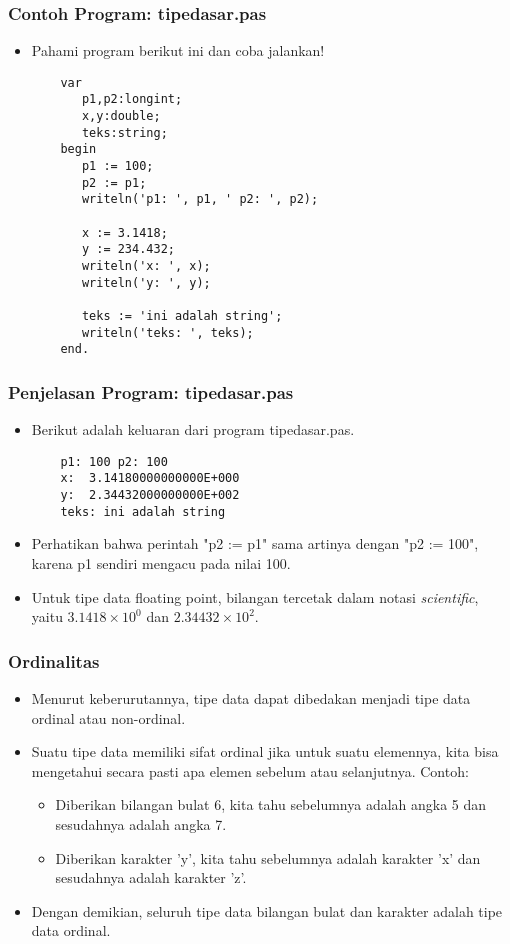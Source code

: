 \documentclass{beamer}
\begin{document}
\begin{frame}[fragile]
\frametitle{Contoh Program: tipedasar.pas}
\begin{itemize}
	\item Pahami program berikut ini dan coba jalankan!
	\begin{lstlisting}
	var
	   p1,p2:longint;
	   x,y:double;
	   teks:string;
	begin
	   p1 := 100;
	   p2 := p1;
	   writeln('p1: ', p1, ' p2: ', p2);
	   
	   x := 3.1418;
	   y := 234.432;
	   writeln('x: ', x);
	   writeln('y: ', y);
	   
	   teks := 'ini adalah string';
	   writeln('teks: ', teks);
	end.
	\end{lstlisting}
\end{itemize}
\end{frame}

\begin{frame}[fragile]
\frametitle{Penjelasan Program: tipedasar.pas}
\begin{itemize}
	\item Berikut adalah keluaran dari program tipedasar.pas.
	\begin{lstlisting}
	p1: 100 p2: 100
	x:  3.14180000000000E+000
	y:  2.34432000000000E+002
	teks: ini adalah string
	\end{lstlisting}
	\item Perhatikan bahwa perintah "p2 := p1" sama artinya dengan "p2 := 100", karena p1 sendiri mengacu pada nilai 100.
	\item Untuk tipe data floating point, bilangan tercetak dalam notasi \textit{scientific}, yaitu $3.1418 \times 10^{0}$ dan $2.34432 \times 10^{2}$.
\end{itemize}
\end{frame}

\begin{frame}
\frametitle{Ordinalitas}
\begin{itemize}
	\item Menurut keberurutannya, tipe data dapat dibedakan menjadi tipe data ordinal atau non-ordinal.
	\item Suatu tipe data memiliki sifat ordinal jika untuk suatu elemennya, kita bisa mengetahui secara pasti apa elemen sebelum atau selanjutnya. Contoh:
	\begin{itemize}
		\item Diberikan bilangan bulat 6, kita tahu sebelumnya adalah angka 5 dan sesudahnya adalah angka 7.
		\item Diberikan karakter 'y', kita tahu sebelumnya adalah karakter 'x' dan sesudahnya adalah karakter 'z'.
	\end{itemize}
	\item Dengan demikian, seluruh tipe data bilangan bulat dan karakter adalah tipe data ordinal.
\end{itemize}
\end{frame}
\end{document}
